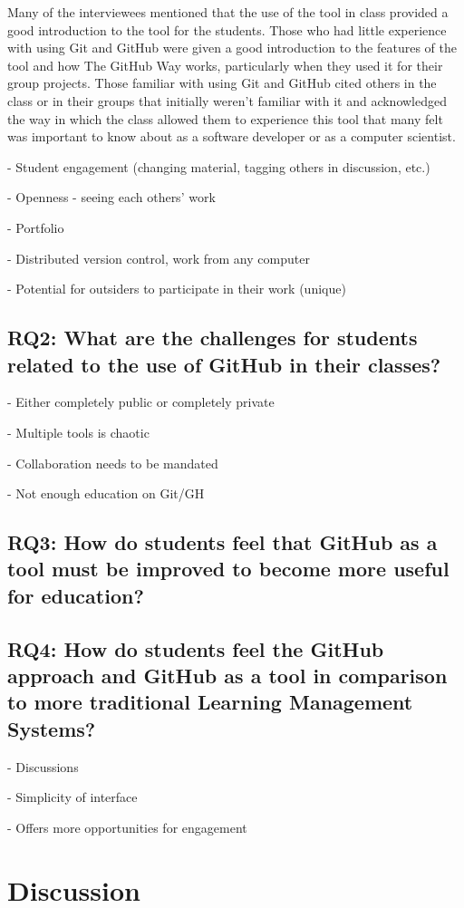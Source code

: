 Many of the interviewees mentioned that the use of the tool in class provided a good introduction to the tool for the students. Those who had little experience with using Git and GitHub were given a good introduction to the features of the tool and how The GitHub Way works, particularly when they used it for their group projects. Those familiar with using Git and GitHub cited others in the class or in their groups that initially weren't familiar with it and acknowledged the way in which the class allowed them to experience this tool that many felt was important to know about as a software developer or as a computer scientist.

- Student engagement (changing material, tagging others in discussion, etc.)

- Openness - seeing each others' work

- Portfolio

- Distributed version control, work from any computer

- Potential for outsiders to participate in their work (unique)

\subsection{RQ2: What are the challenges for students related to the use of GitHub in their classes?}
- Either completely public or completely private

- Multiple tools is chaotic

- Collaboration needs to be mandated

- Not enough education on Git/GH

\subsection{RQ3: How do students feel that GitHub as a tool must be improved to become more useful for education?}

\subsection{RQ4: How do students feel the GitHub approach and GitHub as a tool in comparison to more traditional Learning Management Systems?}
- Discussions

- Simplicity of interface

- Offers more opportunities for engagement

\section{Discussion}
